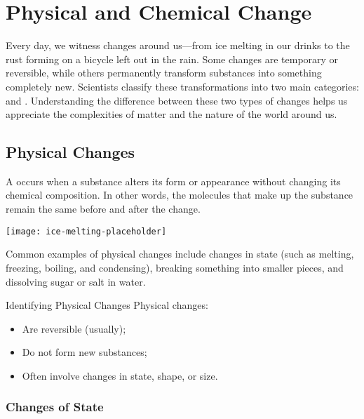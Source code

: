 \chapter{Physical and Chemical Change}

Every day, we witness changes around us—from ice melting in our drinks to the rust forming on a bicycle left out in the rain. Some changes are temporary or reversible, while others permanently transform substances into something completely new. Scientists classify these transformations into two main categories:  and . Understanding the difference between these two types of changes helps us appreciate the complexities of matter and the nature of the world around us.

\section{Physical Changes}

A  occurs when a substance alters its form or appearance without changing its chemical composition. In other words, the molecules that make up the substance remain the same before and after the change.

\begin{marginfigure}
\centering
\texttt{[image: ice-melting-placeholder]}
\caption{Ice melting demonstrates a physical change.}
\label{fig:icemelting}
\end{marginfigure}

Common examples of physical changes include changes in state (such as melting, freezing, boiling, and condensing), breaking something into smaller pieces, and dissolving sugar or salt in water.

\begin{keyconcept}{Identifying Physical Changes}
Physical changes:
\begin{itemize}
    \item Are reversible (usually);
    \item Do not form new substances;
    \item Often involve changes in state, shape, or size.
\end{itemize}
\end{keyconcept}

\subsection{Changes of State}

